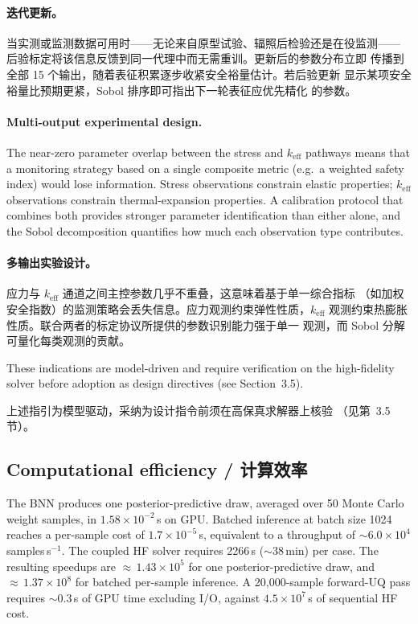 \documentclass[11pt,a4paper]{article}
\newcommand{\keff}{\ensuremath{k_{\mathrm{eff}}}}
\begin{document}
\paragraph{迭代更新。}
当实测或监测数据可用时——无论来自原型试验、辐照后检验还是在役监测——
后验标定将该信息反馈到同一代理中而无需重训。更新后的参数分布立即
传播到全部 15 个输出，随着表征积累逐步收紧安全裕量估计。若后验更新
显示某项安全裕量比预期更紧，Sobol 排序即可指出下一轮表征应优先精化
的参数。

\paragraph{Multi-output experimental design.}
The near-zero parameter overlap between the stress and \keff{} pathways
means that a monitoring strategy based on a single composite metric
(e.g.\ a weighted safety index) would lose information. Stress
observations constrain elastic properties; \keff{} observations
constrain thermal-expansion properties. A calibration protocol that
combines both provides stronger parameter identification than either
alone, and the Sobol decomposition quantifies how much each observation
type contributes.

\paragraph{多输出实验设计。}
应力与 \keff{} 通道之间主控参数几乎不重叠，这意味着基于单一综合指标
（如加权安全指数）的监测策略会丢失信息。应力观测约束弹性性质，\keff{}
观测约束热膨胀性质。联合两者的标定协议所提供的参数识别能力强于单一
观测，而 Sobol 分解可量化每类观测的贡献。

These indications are model-driven and require verification on the
high-fidelity solver before adoption as design directives (see
Section~3.5).

上述指引为模型驱动，采纳为设计指令前须在高保真求解器上核验
（见第~3.5 节）。

\subsection{Computational efficiency / 计算效率}

The BNN produces one posterior-predictive draw, averaged over 50 Monte
Carlo weight samples, in $1.58\times10^{-2}$\,s on GPU. Batched
inference at batch size 1024 reaches a per-sample cost of
$1.7\times10^{-5}$\,s, equivalent to a throughput of
${\sim}6.0\times10^{4}$ samples\,s$^{-1}$. The coupled HF solver
requires 2266\,s (${\sim}38$\,min) per case. The resulting speedups are
${\approx}\,1.43\times10^{5}$ for one posterior-predictive draw, and
${\approx}\,1.37\times10^{8}$ for batched per-sample inference.
A 20{,}000-sample forward-UQ pass requires ${\sim}0.3$\,s of GPU time
excluding I/O, against $4.5\times10^{7}$\,s of sequential HF cost.
\end{document}
